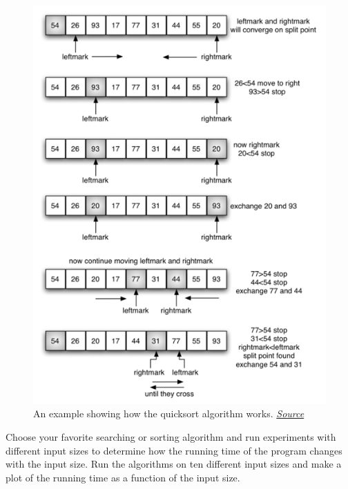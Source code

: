 \begin{figure}
    \centering
    \includegraphics[width=\textwidth]{lectures/images/quicksort.png}
    \caption{An example showing how the quicksort algorithm works. \href{https://runestone.academy/runestone/books/published/pythonds/SortSearch/TheQuickSort.html}{\textit{Source}}}
    \label{fig:insertion_sort}
\end{figure}


\begin{exercise}
Choose your favorite searching or sorting algorithm and run experiments with different input sizes to determine how the running time of the program changes with the input size. Run the algorithms on ten different input sizes and make a plot of the running time as a function of the input size.

\end{exercise}